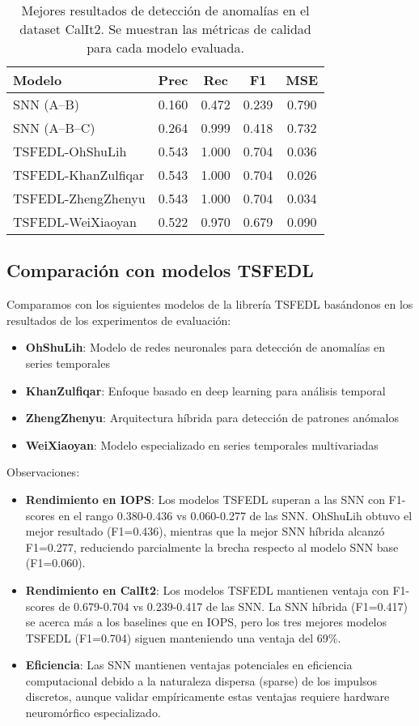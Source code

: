 \begin{table}[htbp]
\centering
\small
\begin{tabular}{lcccc}
\hline\hline
\textbf{Modelo} & \textbf{Prec} & \textbf{Rec} & \textbf{F1} & \textbf{MSE} \\
\hline
SNN (A--B) & 0.160 & 0.472 & 0.239 & 0.790 \\
SNN (A--B--C) & 0.264 & 0.999 & 0.418 & 0.732 \\
TSFEDL-OhShuLih & 0.543 & 1.000 & 0.704 & 0.036 \\
TSFEDL-KhanZulfiqar & 0.543 & 1.000 & 0.704 & 0.026 \\
TSFEDL-ZhengZhenyu & 0.543 & 1.000 & 0.704 & 0.034 \\
TSFEDL-WeiXiaoyan & 0.522 & 0.970 & 0.679 & 0.090 \\
\hline\hline
\end{tabular}
\caption{Mejores resultados de detección de anomalías en el dataset CalIt2. Se muestran las métricas de calidad para cada modelo evaluada.}
\label{tab:resultados-iops}
\end{table}

\subsection{Comparación con modelos TSFEDL}
Comparamos con los siguientes modelos de la librería TSFEDL basándonos en los resultados de los experimentos de evaluación:
\begin{itemize}
    \item \textbf{OhShuLih}: Modelo de redes neuronales para detección de anomalías en series temporales
    \item \textbf{KhanZulfiqar}: Enfoque basado en deep learning para análisis temporal
    \item \textbf{ZhengZhenyu}: Arquitectura híbrida para detección de patrones anómalos
    \item \textbf{WeiXiaoyan}: Modelo especializado en series temporales multivariadas
\end{itemize}
Observaciones:
\begin{itemize}
    \item \textbf{Rendimiento en IOPS}: Los modelos TSFEDL superan a las SNN con F1-scores en el rango 0.380-0.436 vs 0.060-0.277 de las SNN. OhShuLih obtuvo el mejor resultado (F1=0.436), mientras que la mejor SNN híbrida alcanzó F1=0.277, reduciendo parcialmente la brecha respecto al modelo SNN base (F1=0.060).
    \item \textbf{Rendimiento en CalIt2}: Los modelos TSFEDL mantienen ventaja con F1-scores de 0.679-0.704 vs 0.239-0.417 de las SNN. La SNN híbrida (F1=0.417) se acerca más a los baselines que en IOPS, pero los tres mejores modelos TSFEDL (F1=0.704) siguen manteniendo una ventaja del 69\%.
    \item \textbf{Eficiencia}: Las SNN mantienen ventajas potenciales en eficiencia computacional debido a la naturaleza dispersa (sparse) de los impulsos discretos, aunque validar empíricamente estas ventajas requiere hardware neuromórfico especializado.
\end{itemize}

